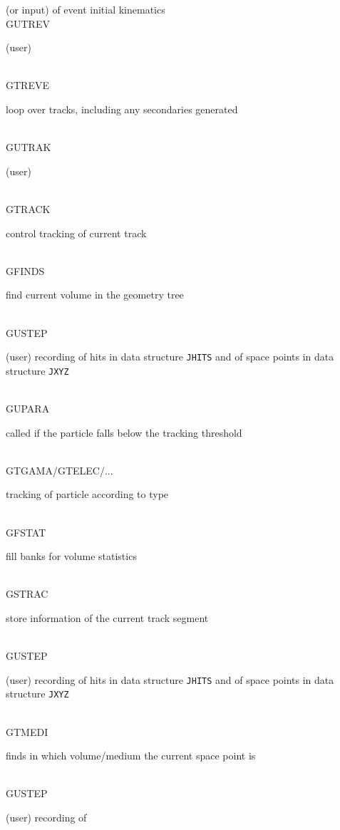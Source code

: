 \begin{tabbing}
{(or input) of event initial kinematics \vspace{.20cm}} \\
  \> \> \> GUTREV \> \> \> \> \> \> \parbox[t]{7.5cm}{(user) \vspace{.20cm}} \\
  \> \> \> \> GTREVE \> \> \> \> \> \parbox[t]{7.5cm}{loop over tracks,
including any secondaries generated \vspace{.20cm}} \\
  \> \> \> \> \> GUTRAK \> \> \> \> \parbox[t]{7.5cm}{(user) \vspace{.20cm}} \\
  \> \> \> \> \> \> GTRACK \> \> \> \parbox[t]{7.5cm}{control tracking of
current track \vspace{.20cm}} \\
  \> \> \> \> \> \> \> GFINDS \> \> \parbox[t]{7.5cm}{find current
volume in the geometry tree \vspace{.20cm}} \\
  \> \> \> \> \> \> \> GUSTEP \> \> \parbox[t]{7.5cm}{(user) recording of
hits in data structure {\tt JHITS} and of space points in data structure
{\tt JXYZ} \vspace{.20cm}} \\
  \> \> \> \> \> \> \> GUPARA \> \> \parbox[t]{7.5cm}{called if the particle
falls below the tracking threshold \vspace{.20cm}} \\
  \> \> \> \> \> \> \> \> GTGAMA/GTELEC/... \> \parbox[t]{7.5cm}{tracking
of particle according to type \vspace{.20cm}} \\
  \> \> \> \> \> \> \> GFSTAT \>  \> \parbox[t]{7.5cm}{fill banks for volume
statistics \vspace{.20cm}} \\
  \> \> \> \> \> \> \> GSTRAC \>  \> \parbox[t]{7.5cm}{store information
of the current track segment \vspace{.20cm}} \\
  \> \> \> \> \> \> \> GUSTEP \>  \> \parbox[t]{7.5cm}{(user) recording of
hits in data structure {\tt JHITS} and of space points in data structure
{\tt JXYZ} \vspace{.20cm}} \\
  \> \> \> \> \> \> \> GTMEDI \>  \> \parbox[t]{7.5cm}{finds in which           
volume/medium the current space point is \vspace{.20cm}} \\
  \> \> \> \> \> \> \> GUSTEP \>  \> \parbox[t]{7.5cm}{(user) recording of
}
\end{tabbing}
